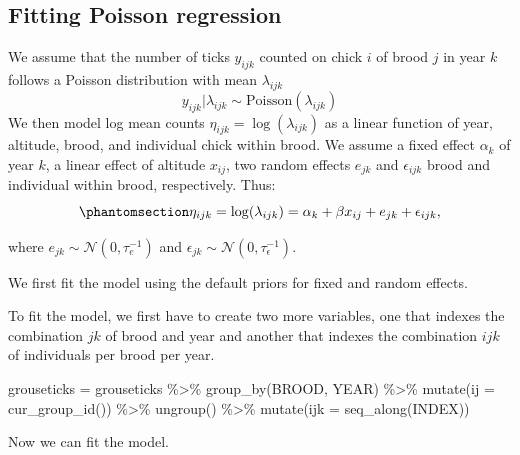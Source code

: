 \documentclass[
  letterpaper,
  DIV=11,
  numbers=noendperiod]{scrartcl}
\newenvironment{Shaded}{\begin{snugshade}}{\end{snugshade}}
\newcommand{\AttributeTok}[1]{\textcolor[rgb]{0.40,0.45,0.13}{#1}}
\newcommand{\FunctionTok}[1]{\textcolor[rgb]{0.28,0.35,0.67}{#1}}
\newcommand{\NormalTok}[1]{\textcolor[rgb]{0.00,0.23,0.31}{#1}}
\newcommand{\OtherTok}[1]{\textcolor[rgb]{0.00,0.23,0.31}{#1}}
\newcommand{\SpecialCharTok}[1]{\textcolor[rgb]{0.37,0.37,0.37}{#1}}
\begin{document}
\subsection{Fitting Poisson
regression}\label{fitting-poisson-regression}

We assume that the number of ticks \(y_{ijk}\) counted on chick \(i\) of
brood \(j\) in year \(k\) follows a Poisson distribution with mean
\(\lambda_{ijk}\) \[
y_{ijk}|\lambda_{ijk}\sim\text{Poisson}(\lambda_{ijk})
\] We then model log mean counts \(\eta_{ijk} = \log(\lambda_{ijk})\) as
a linear function of year, altitude, brood, and individual chick within
brood. We assume a fixed effect \(\alpha_k\) of year \(k\), a linear
effect of altitude \(x_{ij}\), two random effects \(e_{jk}\) and
\(\epsilon_{ijk}\) brood and individual within brood, respectively.
Thus: \begin{equation}\phantomsection\label{eq-linpred}{
\eta_{ijk} = \log(\lambda_{ijk}) = \alpha_k + \beta x_{ij} + e_{jk} + \epsilon_{ijk},
}\end{equation}

where \(e_{jk}\sim\mathcal{N}(0,\tau^{-1}_e)\) and
\(\epsilon_{jk}\sim\mathcal{N}(0,\tau^{-1}_\epsilon)\).

We first fit the model using the default priors for fixed and random
effects.

To fit the model, we first have to create two more variables, one that
indexes the combination \(jk\) of brood and year and another that
indexes the combination \(ijk\) of individuals per brood per year.

\begin{Shaded}
\begin{Highlighting}[]
\NormalTok{grouseticks  }\OtherTok{=}\NormalTok{ grouseticks }\SpecialCharTok{\%\textgreater{}\%}
  \FunctionTok{group\_by}\NormalTok{(BROOD, YEAR) }\SpecialCharTok{\%\textgreater{}\%}
  \FunctionTok{mutate}\NormalTok{(}\AttributeTok{ij =} \FunctionTok{cur\_group\_id}\NormalTok{()) }\SpecialCharTok{\%\textgreater{}\%}
  \FunctionTok{ungroup}\NormalTok{() }\SpecialCharTok{\%\textgreater{}\%}
  \FunctionTok{mutate}\NormalTok{(}\AttributeTok{ijk =} \FunctionTok{seq\_along}\NormalTok{(INDEX))}
\end{Highlighting}
\end{Shaded}

Now we can fit the model.
\end{document}
